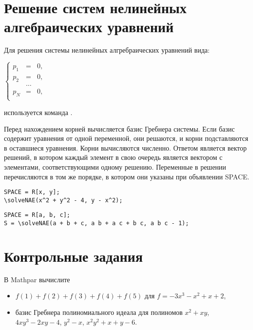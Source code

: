 \section{Решение систем нелинейных алгебраических уравнений}

Для решения системы нелинейных алгребраических уравнений вида:

$\left\{\begin{array}{rcl} p_{1} & = & 0,\\ p_{2} & = & 0,\\ & \ldots\\ p_{N} & = & 0,\\ \end{array} \right. $

используется команда .

Перед нахождением корней вычисляется базис Гребнера системы.
Если базис содержит уравнения от одной переменной, они решаются, и корни подставляются в оставшиеся уравнения. Корни вычисляются численно.
Ответом является вектор решений, в котором каждый элемент в свою очередь является вектором с элементами, соответствующими одному решению. Переменные
в решении перечисляются в том же порядке, в котором они указаны при объявлении SPACE.

\begin{verbatim}
SPACE = R[x, y];
\solveNAE(x^2 + y^2 - 4, y - x^2);
\end{verbatim}

\begin{verbatim}
SPACE = R[a, b, c];
S = \solveNAE(a + b + c, a b + a c + b c, a b c - 1);
\end{verbatim}

\section{Контрольные задания}
В  Mathpar вычислите 
\begin{itemize}
 \item $f(1)+f(2)+f(3)+f(4)+f(5)$ для $f=-3x^3-x^2+x+2$,
 \item базис Гребнера полиномиального идеала для полиномов 
$x^2+xy$,  $4xy^3-2xy-4$,  
$y^2-x$,  $x^2y^2+x+y-6$. 
 \end{itemize}
